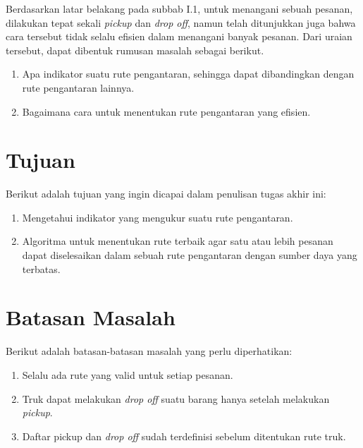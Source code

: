 Berdasarkan latar belakang pada subbab I.1, untuk menangani sebuah pesanan, dilakukan tepat 
sekali \textit{pickup} dan \textit{drop off}, namun telah ditunjukkan juga bahwa cara tersebut 
tidak selalu efisien dalam menangani banyak pesanan. 
Dari uraian tersebut, dapat dibentuk rumusan masalah sebagai berikut.

\begin{enumerate}
    \item Apa indikator suatu rute pengantaran, sehingga dapat dibandingkan dengan rute pengantaran lainnya.
    \item Bagaimana cara untuk menentukan rute pengantaran yang efisien.
\end{enumerate}

\section{Tujuan}

Berikut adalah tujuan yang ingin dicapai dalam penulisan tugas akhir ini:

\begin{enumerate}
    \item Mengetahui indikator yang mengukur suatu rute pengantaran.
    \item Algoritma untuk menentukan rute terbaik agar satu atau lebih pesanan dapat diselesaikan dalam sebuah rute pengantaran dengan sumber daya yang terbatas.
\end{enumerate}

\section{Batasan Masalah}

Berikut adalah batasan-batasan masalah yang perlu diperhatikan:

\begin{enumerate}
    \item Selalu ada rute yang valid untuk setiap pesanan.
    \item Truk dapat melakukan \textit{drop off} suatu barang hanya setelah melakukan \textit{pickup}.
    \item Daftar pickup dan \textit{drop off} sudah terdefinisi sebelum ditentukan rute truk.
\end{enumerate}

